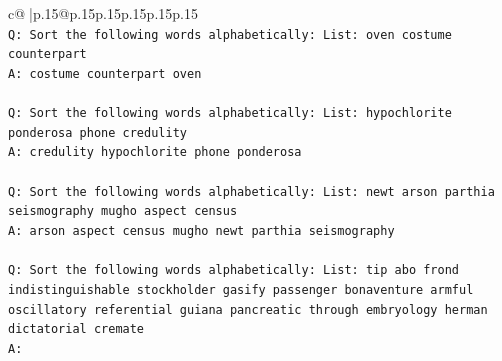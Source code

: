 \documentclass{article}
\begin{document}
{\begin{supertabular}{c@{$\;$}|p{.15\linewidth}@{}p{.15\linewidth}p{.15\linewidth}p{.15\linewidth}p{.15\linewidth}p{.15\linewidth}}
{{{\\ 
\texttt{Q: Sort the following words alphabetically: List: oven costume counterpart} \\
\texttt{A: costume counterpart oven} \\
\\ 
\texttt{Q: Sort the following words alphabetically: List: hypochlorite ponderosa phone credulity} \\
\texttt{A: credulity hypochlorite phone ponderosa} \\
\\ 
\texttt{Q: Sort the following words alphabetically: List: newt arson parthia seismography mugho aspect census} \\
\texttt{A: arson aspect census mugho newt parthia seismography} \\
\\ 
\texttt{Q: Sort the following words alphabetically: List: tip abo frond indistinguishable stockholder gasify passenger bonaventure armful oscillatory referential guiana pancreatic through embryology herman dictatorial cremate} \\
\texttt{A:} \\
            }
        }
    }
     \\ \\


\end{supertabular}}
\end{document}
